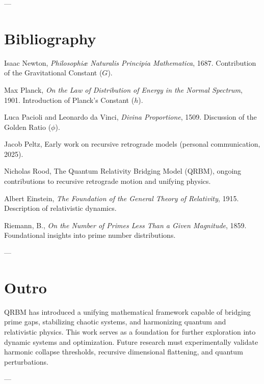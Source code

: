 \documentclass{article}
\begin{document}
---

\section*{Bibliography}

\begin{thebibliography}{99}

Isaac Newton, \emph{Philosophiæ Naturalis Principia Mathematica}, 1687. Contribution of the Gravitational Constant (\(G\)).

Max Planck, \emph{On the Law of Distribution of Energy in the Normal Spectrum}, 1901. Introduction of Planck’s Constant (\(h\)).

Luca Pacioli and Leonardo da Vinci, \emph{Divina Proportione}, 1509. Discussion of the Golden Ratio (\(\phi\)).

Jacob Peltz, Early work on recursive retrograde models (personal communication, 2025).

Nicholas Rood, The Quantum Relativity Bridging Model (QRBM), ongoing contributions to recursive retrograde motion and unifying physics.

Albert Einstein, \emph{The Foundation of the General Theory of Relativity}, 1915. Description of relativistic dynamics.

Riemann, B., \emph{On the Number of Primes Less Than a Given Magnitude}, 1859. Foundational insights into prime number distributions.

\end{thebibliography}

---

\section*{Outro}

QRBM has introduced a unifying mathematical framework capable of bridging prime gaps, stabilizing chaotic systems, and harmonizing quantum and relativistic physics. This work serves as a foundation for further exploration into dynamic systems and optimization. Future research must experimentally validate harmonic collapse thresholds, recursive dimensional flattening, and quantum perturbations.

---
\end{document}
